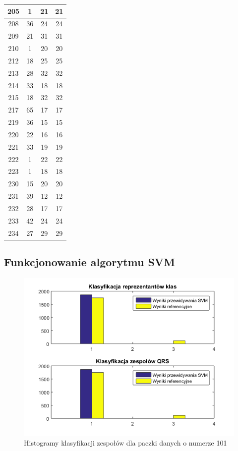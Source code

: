 \begin{table}[!tp]
\begin{tabular}{|c|c|c|c|}
		205 &  1 & 21 & 21\\ \hline
		208 & 36 & 24 & 24\\ \hline
		209 & 21 & 31 & 31\\ \hline
		210 &  1 & 20 & 20\\ \hline
		212 & 18 & 25 & 25\\ \hline
		213 & 28 & 32 & 32\\ \hline
		214 & 33 & 18 & 18\\ \hline
		215 & 18 & 32 & 32\\ \hline
		217 & 65 & 17 & 17\\ \hline
		219 & 36 & 15 & 15\\ \hline
		220 & 22 & 16 & 16\\ \hline	
		221 & 33 & 19 & 19\\ \hline
		222 &  1 & 22 & 22\\ \hline
		223 &  1 & 18 & 18\\ \hline
		230 & 15 & 20 & 20\\ \hline
		231 & 39 & 12 & 12\\ \hline
		232 & 28 & 17 & 17\\ \hline
		233 & 42 & 24 & 24\\ \hline
		234 & 27 & 29 & 29\\ \hline
	\end{tabular}
\end{table}


\subsection{Funkcjonowanie algorytmu SVM}

\begin{figure}[!htp]
	\centering
	\includegraphics[width=15cm]{Grafika/101_2_3}
	\caption{Histogramy klasyfikacji zespołów dla paczki danych o numerze 101}
	\label{fig:hist1}
\end{figure}

